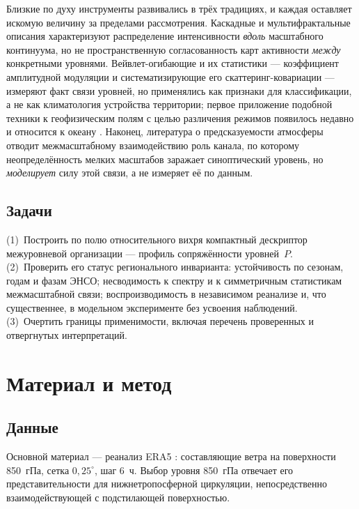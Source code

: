 \documentclass[11pt,a4paper]{article}
\begin{document}
Близкие по духу инструменты развивались в трёх традициях, и каждая оставляет искомую величину за пределами рассмотрения. Каскадные и мультифрактальные описания \cite{LovejoySchertzer2013,Lovejoy2011,Kouhen2024} характеризуют распределение интенсивности \emph{вдоль} масштабного континуума, но не пространственную согласованность карт активности \emph{между} конкретными уровнями. Вейвлет-огибающие и их статистики --- коэффициент амплитудной модуляции \cite{Farge1992,Mathis2009} и систематизирующие его скаттеринг-ковариации \cite{Mallat2012,BrunaMallat2013,Cheng2024} --- измеряют факт связи уровней, но применялись как признаки для классификации, а не как климатология устройства территории; первое приложение подобной техники к геофизическим полям с целью различения режимов появилось недавно и относится к океану \cite{Skinner2025}. Наконец, литература о предсказуемости атмосферы \cite{Lorenz1969,Zhang2007,RotunnoSnyder2008,Judt2020,SelzCraig2023} отводит межмасштабному взаимодействию роль канала, по которому неопределённость мелких масштабов заражает синоптический уровень, но \emph{моделирует} силу этой связи, а не измеряет её по данным.

\subsection{Задачи}

(1)~Построить по полю относительного вихря компактный дескриптор межуровневой организации --- профиль сопряжённости уровней~$P$. (2)~Проверить его статус регионального инварианта: устойчивость по сезонам, годам и фазам ЭНСО; несводимость к спектру и к симметричным статистикам межмасштабной связи; воспроизводимость в независимом реанализе и, что существеннее, в модельном эксперименте без усвоения наблюдений. (3)~Очертить границы применимости, включая перечень проверенных и отвергнутых интерпретаций.

\section{Материал и метод}
\label{sec:data}

\subsection{Данные}

Основной материал --- реанализ ERA5 \cite{Hersbach2020,Soci2024}: составляющие ветра на поверхности 850~гПа, сетка $0{,}25^\circ$, шаг 6~ч. Выбор уровня 850~гПа отвечает его представительности для нижнетропосферной циркуляции, непосредственно взаимодействующей с подстилающей поверхностью.
\end{document}
